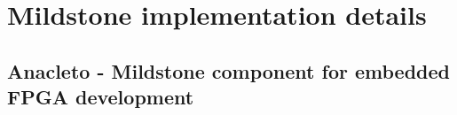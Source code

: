 \chapter{Mildstone implementation details}
\label{section:5_mildstone}


\section{Anacleto - Mildstone component for embedded FPGA development}

